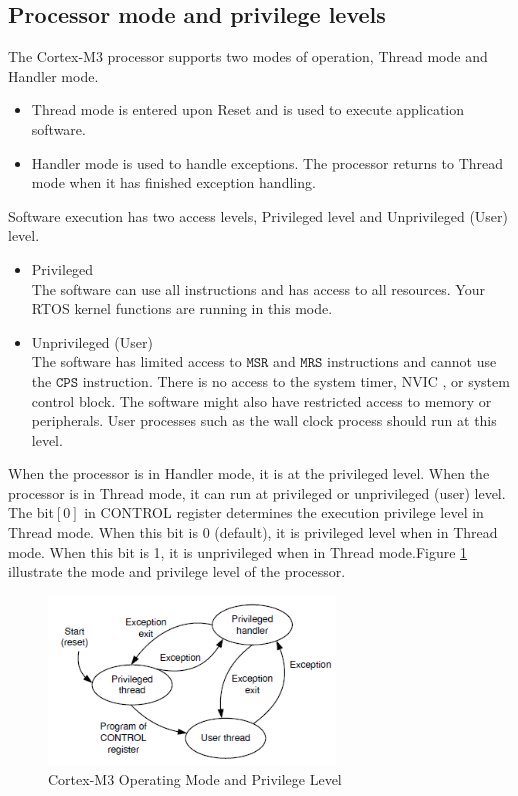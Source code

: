 \subsection{Processor mode and privilege levels}
\label{sec_op_mode}
The Cortex-M3 processor supports two modes of operation, Thread mode and Handler mode. 
\begin{itemize}
\item Thread mode is entered upon Reset and is used to execute application software.
\item Handler mode is used to handle exceptions. The processor returns to Thread mode when it has finished exception handling.  
\end{itemize}
Software execution has two access levels, 
Privileged level and Unprivileged (User) level. 
\begin{itemize}
\item Privileged \\
        The software can use all instructions and has access to all resources. Your RTOS kernel functions are running in this mode. 
\item Unprivileged (User) \\
        The software has limited access to {\bf $\mathtt{MSR}$} and {\bf $\mathtt{MRS}$} instructions and cannot use the {\bf $\mathtt{CPS}$} instruction.  There is no access to the system timer, NVIC , or system control block. The software might also have restricted access to memory or peripherals. User processes such as the wall clock process should run at this level.  
\end{itemize}

When the processor is in Handler mode, it is at the privileged level. When the processor is in Thread mode, it can run at privileged or unprivileged (user) level. The bit$[0]$ in CONTROL register determines the execution privilege level in Thread mode. When this bit is 0 (default), it  is privileged level when in Thread mode. When this bit is 1, it is unprivileged when in Thread mode.Figure \ref{fig_cm3_op_modes} illustrate the mode and privilege level of the processor. 
\begin{figure}[ht]
\centerline{\includegraphics[width=3in]{figure/CM3_Op_Modes}}
\caption[Cortex-M3 Operating Mode and Privilege Level] {Cortex-M3 Operating Mode and Privilege Level\cite{yiu2009definitive}}
\label{fig_cm3_op_modes}
\end{figure}

